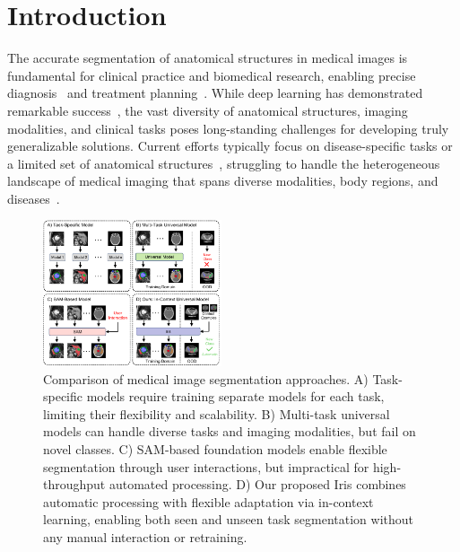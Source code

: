 \section{Introduction}
\label{sec:intro}

The accurate segmentation of anatomical structures in medical images is fundamental for clinical practice and biomedical research, enabling precise diagnosis~\cite{de2018clinically,shen2015multi} and treatment planning~\cite{nestle2005comparison}. While deep learning has demonstrated remarkable success~\cite{liu2021review,wang2022medical}, the vast diversity of anatomical structures, imaging modalities, and clinical tasks poses long-standing challenges for developing truly generalizable solutions. Current efforts typically focus on disease-specific tasks or a limited set of anatomical structures~\cite{isensee2021nnu,liu2021refined,liu2022transfusion,chang2022deeprecon,gao2022data,gao2024training,he2023dealing,zhangli2022region,liu2021label}, struggling to handle the heterogeneous landscape of medical imaging that spans diverse modalities, body regions, and diseases~\cite{yoon2023domain,niu2024survey}.


\begin{figure}[t]
\begin{center}
\includegraphics[width=0.47\textwidth]{./fig/paradigm_comparison.pdf}
\end{center}
\vspace{-1em}
\caption{Comparison of medical image segmentation approaches. A) Task-specific models require training separate models for each task, limiting their flexibility and scalability. B) Multi-task universal models can handle diverse tasks and imaging modalities, but fail on novel classes. C) SAM-based foundation models enable flexible segmentation through user interactions, but impractical for high-throughput automated processing. D) Our proposed Iris combines automatic processing with flexible adaptation via in-context learning, enabling both seen and unseen task segmentation without any manual interaction or retraining.}
\label{fig:fig1}
\vspace{-1em}
\end{figure}



